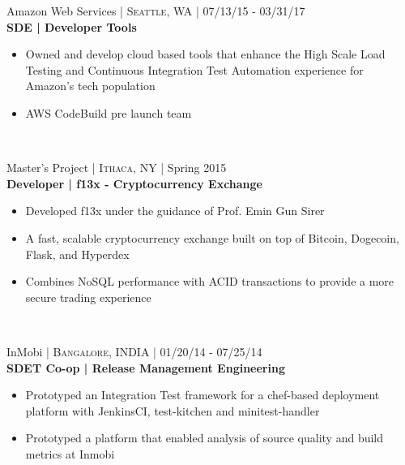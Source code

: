 \documentclass[10pt]{article} %
\begin{document}
{\begin{minipage}[t]{0.57\textwidth}
{\raggedright\large Amazon Web Services \normalsize\textsc{ | Seattle, WA} | 07/13/15 - 03/31/17\\
\textbf{SDE | Developer Tools}\\[5pt]}
\vspace{0pt}
\begin{itemize}\itemsep-0.25em
    \item Owned and develop cloud based tools that enhance the High Scale Load Testing and Continuous Integration Test Automation experience for Amazon's tech population
    \item AWS CodeBuild pre launch team
\end{itemize}\\

{\raggedright\large Master's Project \normalsize\textsc{ | Ithaca, NY} | Spring 2015\\
\textbf{Developer | f13x - Cryptocurrency Exchange }\\[5pt]}
\begin{itemize}\itemsep-0.25em
    \item Developed f13x under the guidance of Prof. Emin Gun Sirer
    \item A fast, scalable cryptocurrency exchange built on top of Bitcoin, Dogecoin, Flask, and Hyperdex
    \item Combines NoSQL performance with ACID transactions to provide a more secure trading experience
\end{itemize}\\




{\raggedright\large InMobi \normalsize\textsc{ | Bangalore, INDIA} | 01/20/14 - 07/25/14\\
\textbf{SDET Co-op | Release Management Engineering}\\[5pt]}
\vspace{0pt}
\begin{itemize}\itemsep-0.25em
    \item Prototyped an Integration Test framework for a chef-based deployment platform with JenkinsCI, test-kitchen and minitest-handler
    \item Prototyped a platform that enabled analysis of source quality and build metrics at Inmobi
\end{itemize}\\


\end{minipage}}
\end{document}
